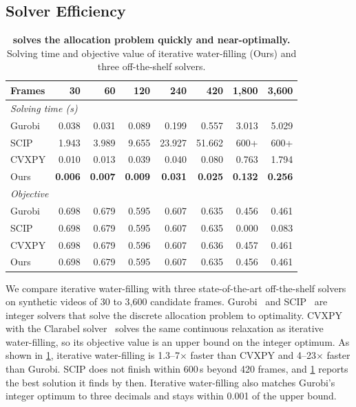 \subsection{Solver Efficiency}
\label{sec:supp-solver}

\begin{table}[t]
  \centering
  \footnotesize
  \setlength{\tabcolsep}{2.6pt}
  \renewcommand{\arraystretch}{1.1}
  \begin{tabular}{l r r r r r r r}
    \toprule
    Frames & 30 & 60 & 120 & 240 & 420 & 1,800 & 3,600 \\
    \midrule
    \multicolumn{8}{l}{\textit{Solving time (s)}} \\
    Gurobi & 0.038 & 0.031 & 0.089 & 0.199 & 0.557 & 3.013 & 5.029 \\
    SCIP   & 1.943 & 3.989 & 9.655 & 23.927 & 51.662 & 600+ & 600+ \\
    CVXPY  & 0.010 & 0.013 & 0.039 & 0.040 & 0.080 & 0.763 & 1.794 \\
    Ours   & \textbf{0.006} & \textbf{0.007} & \textbf{0.009} & \textbf{0.031} & \textbf{0.025} & \textbf{0.132} & \textbf{0.256} \\
    \midrule
    \multicolumn{8}{l}{\textit{Objective}} \\
    Gurobi & 0.698 & 0.679 & 0.595 & 0.607 & 0.635 & 0.456 & 0.461 \\
    SCIP   & 0.698 & 0.679 & 0.595 & 0.607 & 0.635 & 0.000 & 0.083 \\
    CVXPY  & 0.698 & 0.679 & 0.596 & 0.607 & 0.636 & 0.457 & 0.461 \\
    Ours   & 0.698 & 0.679 & 0.595 & 0.607 & 0.635 & 0.456 & 0.461 \\
    \bottomrule
  \end{tabular}
  \caption{\textbf{\name solves the allocation problem quickly and near-optimally.} Solving time and objective value of iterative water-filling (Ours) and three off-the-shelf solvers.}
  \label{tab:supp-solver}
\end{table}


We compare iterative water-filling with three state-of-the-art off-the-shelf solvers on synthetic videos of 30 to 3,600 candidate frames. Gurobi~\cite{gurobi} and SCIP~\cite{scip} are integer solvers that solve the discrete allocation problem to optimality. CVXPY~\cite{cvxpy} with the Clarabel solver~\cite{clarabel} solves the same continuous relaxation as iterative water-filling, so its objective value is an upper bound on the integer optimum. As shown in \cref{tab:supp-solver}, iterative water-filling is 1.3--7$\times$ faster than CVXPY and 4--23$\times$ faster than Gurobi. SCIP does not finish within 600\,s beyond 420 frames, and \cref{tab:supp-solver} reports the best solution it finds by then. Iterative water-filling also matches Gurobi's integer optimum to three decimals and stays within 0.001 of the upper bound.

